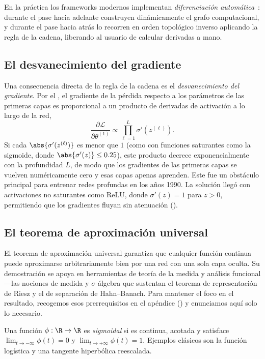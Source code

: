 En la pr\'actica los frameworks modernos implementan \emph{diferenciaci\'on
autom\'atica}~\citep{Neidinger2010IntroductionTA}: durante el pase hacia adelante
construyen din\'amicamente el grafo computacional, y durante el pase hacia atr\'as
lo recorren en orden topol\'ogico inverso aplicando la regla de la cadena, liberando
al usuario de calcular derivadas a mano.

\subsection{El desvanecimiento del gradiente}
\label{sec:found:vanishing}

Una consecuencia directa de la regla de la cadena es el \emph{desvanecimiento del
gradiente}. Por el , el gradiente de la p\'erdida respecto
a los par\'ametros de las primeras capas es proporcional a un producto de derivadas
de activaci\'on a lo largo de la red,
\[
  \frac{\partial \mathcal{L}}{\partial \theta^{(1)}} \propto
  \prod_{\ell=1}^L \sigma'(z^{(\ell)}).
\]
Si cada $\abs{\sigma'(z^{(\ell)})}$ es menor que $1$ (como con funciones saturantes
como la sigmoide, donde $\abs{\sigma'(z)} \le 0.25$), este producto decrece
exponencialmente con la profundidad $L$, de modo que los gradientes de las primeras
capas se vuelven num\'ericamente cero y esas capas apenas aprenden. Este fue un
obst\'aculo principal para entrenar redes profundas en los a\~nos 1990. La
soluci\'on lleg\'o con activaciones no saturantes como ReLU, donde $\sigma'(z) = 1$
para $z > 0$, permitiendo que los gradientes fluyan sin atenuaci\'on
().

\subsection{El teorema de aproximaci\'on universal}
\label{sec:found:universal}

El teorema de aproximaci\'on universal garantiza que cualquier funci\'on continua
puede aproximarse arbitrariamente bien por una red con una sola capa oculta. Su
demostraci\'on se apoya en herramientas de teor\'ia de la medida y an\'alisis
funcional ---las nociones de medida y $\sigma$-\'algebra que sustentan el teorema
de representaci\'on de Riesz y el de separaci\'on de Hahn--Banach. Para mantener el
foco en el resultado, recogemos esos prerrequisitos en el ap\'endice
() y enunciamos aqu\'i solo lo necesario.

\begin{definition}
\label{def:found:sigmoidal}
Una funci\'on $\phi : \R \to \R$ es \emph{sigmoidal} si es continua, acotada y
satisface $\lim_{t\to-\infty}\phi(t) = 0$ y $\lim_{t\to+\infty}\phi(t) = 1$.
Ejemplos cl\'asicos son la funci\'on log\'istica y una tangente hiperb\'olica
reescalada.
\end{definition}

